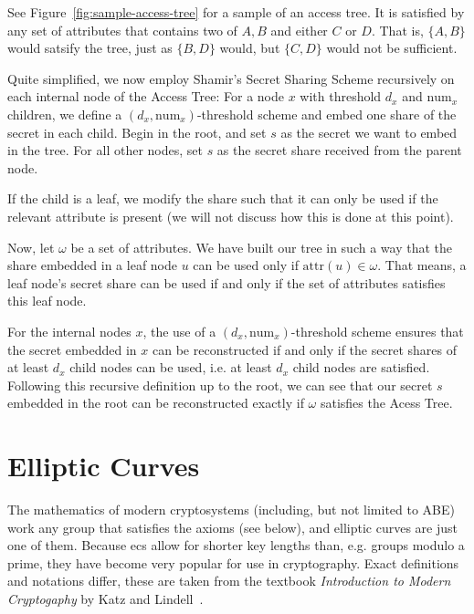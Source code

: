 See Figure~\ref{fig:sample-access-tree} for a sample of an access tree. It is satisfied by any set of attributes that contains two of $A, B$ and either $C$ or $D$.
That is, $\{A,B\}$ would satsify the tree, just as $\{B, D\}$ would, but $\{C, D\}$ would not be sufficient.

Quite simplified, we now employ Shamir's Secret Sharing Scheme recursively on each internal node of the Access Tree:
For a node $x$ with threshold $d_x$ and $\text{num}_x$ children, we define a $(d_x, \text{num}_x)$-threshold scheme and embed one share of the secret in each child.
Begin in the root, and set $s$ as the secret we want to embed in the tree. For all other nodes, set $s$ as the secret share received from the parent node.

If the child is a leaf, we modify the share such that it can only be used if the relevant attribute is present (we will not discuss how this is done at this point).

Now, let $\omega$ be a set of attributes.
We have built our tree in such a way that the share embedded in a leaf node $u$ can be used only if $\text{attr}(u) \in \omega$.
That means, a leaf node's secret share can be used if and only if the set of attributes satisfies this leaf node.

For the internal nodes $x$, the use of a $(d_x, \text{num}_x)$-threshold scheme ensures that the secret embedded in $x$ can be reconstructed if and only if the secret shares of at least $d_x$ child nodes can be used, i.e. at least $d_x$ child nodes are satisfied.
Following this recursive definition up to the root, we can see that our secret $s$ embedded in the root can be reconstructed exactly if $\omega$ satisfies the Acess Tree.



\section{Elliptic Curves}
\label{sec:ec}

The mathematics of modern cryptosystems (including, but not limited to ABE) work any group that satisfies the axioms (see below), and elliptic curves are just one of them.
Because \Glspl{ec} allow for shorter key lengths than, e.g. groups modulo a prime, they have become very popular for use in cryptography.
Exact definitions and notations differ, these are taken from the textbook \emph{Introduction to Modern Cryptogaphy} by Katz and Lindell~\cite{katz_introduction_2015}.

